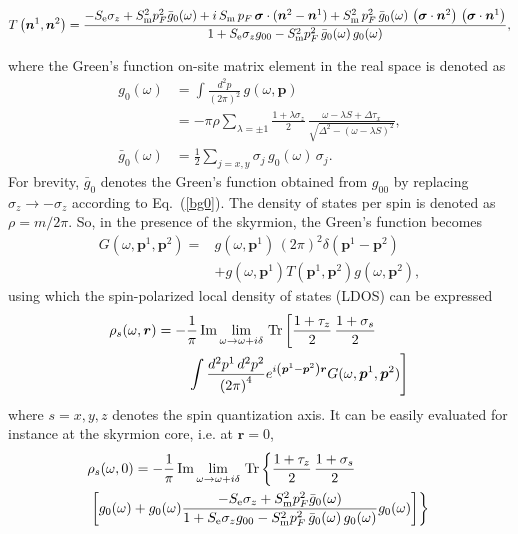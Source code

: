 \documentclass[twocolumn,showpacs,floatfix,nofootinbib,longbibliography]{revtex4-1}
\begin{document}
\begin{widetext}
\begin{equation}
	T\left(\bm n^{1},\bm n^{2}\right) = \frac{-S_{\rm e}\sigma_z+S^2_{\rm m}p_F^2\bar g_{0}(\omega)+i\,S_{\rm m}\,p_F \,  \bm \sigma\cdot(\bm n^{2}- \bm n^{1}) +S^2_{\rm m}\, p^2_F \, \bar g_{0}(\omega)\,\left(\bm \sigma\cdot\bm n^{2}\right)\,\left(\bm \sigma\cdot \bm n^{1}\right)}{1+S_{\rm e}\sigma_zg_{00}-S^2_{\rm m}p_F^2\,\bar g_{0}(\omega)\, g_{0}(\omega)}, \label{TM}
\end{equation}
\end{widetext}
where the Green's function on-site matrix element in the real space is denoted as 
\begin{align}
	g_{0}(\omega) &   =\int \frac{d^2 p}{\left( 2\pi \right)^2}\, g(\omega,\bm p)  	\label{g0} \\
	 & =-\pi\rho\sum_{\lambda = \pm 1} \frac{1+\lambda\sigma_z}{2}\,\frac{\omega-\lambda S+\Delta\tau_x}{\sqrt{\Delta^2-\left( \omega-\lambda S \right)^2}}, \nonumber \\
	 \bar g_{0}(\omega) & = \frac{1}{2} \sum_{j=x,y}\sigma_j\, g_{0}(\omega)\, \sigma_j.\label{bg0}
\end{align}
For brevity, $\bar g_{0}$ denotes the Green's function obtained from $g_{00}$ by replacing $\sigma_z \rightarrow - \sigma_z$ according to Eq.~(\ref{bg0}). The density of states per spin is denoted as $\rho = m/2\pi$. So, in the presence of the skyrmion, the Green's function becomes
\begin{align}
	G(\omega,\bm p^1,\bm p^2) =& g(\omega,\bm p^1)\,(2\pi)^2\delta(\bm p^1-\bm p^2) \nonumber \\ 
	          &  +g(\omega,\bm p^1) T(\bm p^1,\bm p^2) g(\omega,\bm p^2),
	\label{G}
\end{align}
using which the spin-polarized local density of states (LDOS) can be expressed
\begin{align}
	\rho_s(\omega,\bm r) = -&\frac{1}{\pi}\,{\rm Im}\lim_{\omega\rightarrow \omega+i\delta}{\rm\,Tr} \left[ \frac{1+\tau_z}{2}\,\frac{1+\sigma_s}{2} \right. \label{rhor} \\
	&\left.\int \frac{d^2p^1\,d^2p^2}{\left( 2\pi \right)^4} e^{i\left( \bm p^1-\bm p^2 \right)\bm r} G(\omega,\bm p^1,\bm p^2)\right]\, \nonumber 
\end{align}
where $s=x,y,z$ denotes the spin quantization axis. It can be easily evaluated for instance at the skyrmion core, i.e. at $\bm r=0$,
\begin{align}
	& \rho_s(\omega,0) = -\frac{1}{\pi}\,{\rm Im}\lim_{\omega\rightarrow \omega+i\delta}{\rm \,Tr} \left\{  \frac{1+\tau_z}{2}\,\frac{1+\sigma_s}{2}  \right. \label{spldos} \\
	&\left.\left[g_0(\omega)+g_0(\omega)  \frac{-S_{\rm e}\sigma_z+S^2_{\rm m}p_F^2\bar g_{0}(\omega)}{1+S_{\rm e}\sigma_zg_{00}-S^2_{\rm m}p_F^2\,\bar g_{0}(\omega)\, g_{0}(\omega)} g_0(\omega)  \right]\right\}\, \nonumber 
\end{align}
\end{document}
